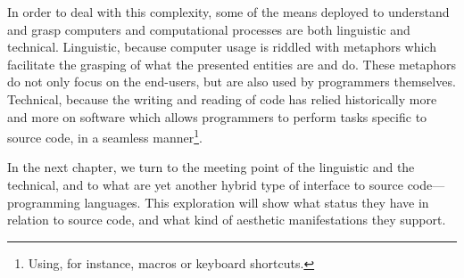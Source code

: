 In order to deal with this complexity, some of the means deployed to understand and grasp computers and computational processes are both linguistic and technical. Linguistic, because computer usage is riddled with metaphors which facilitate the grasping of what the presented entities are and do. These metaphors do not only focus on the end-users, but are also used by programmers themselves. Technical, because the writing and reading of code has relied historically more and more on software which allows programmers to perform tasks specific to source code, in a seamless manner\footnote{Using, for instance, macros or keyboard shortcuts.}.

In the next chapter, we turn to the meeting point of the linguistic and the technical, and to what are yet another hybrid type of interface to source code—programming languages. This exploration will show what status they have in relation to source code, and what kind of aesthetic manifestations they support.